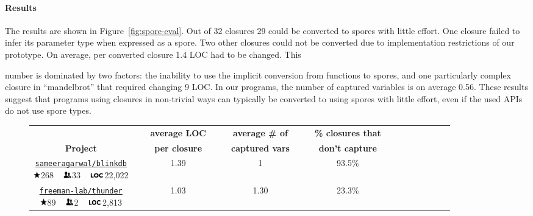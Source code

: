 \documentclass[runningheads]{llncs}
\newcommand{\myrowcolour}{\rowcolor[gray]{0.925}}
\newcommand*\loc{\includegraphics[height=0.65em,keepaspectratio]{loc}}
\newcommand*\stars{\includegraphics[height=0.8em,keepaspectratio]{stars}}
\newcommand*\contribs{\includegraphics[height=0.8em,keepaspectratio]{contribs}}
\begin{document}
\begin{sloppypar}
\paragraph{\textbf{Results}} The results are shown in
Figure~\ref{fig:spore-eval}. Out of 32 closures 29 could be converted
to spores with little effort. One closure failed to infer its parameter
type when expressed as a spore. Two other closures could not be converted
due to implementation restrictions of our prototype. On average, per
converted closure 1.4 LOC had to be changed. This

\noindent number is dominated
by two factors: the inability to use the implicit conversion from functions
to spores, and one particularly complex closure in ``mandelbrot'' that
required changing 9 LOC. In our programs, the number of captured variables
is on average 0.56. These results suggest that programs using closures in
non-trivial ways can typically be converted to using spores with little
effort, even if the used APIs do not use spore types.


\begin{figure}[t!]
\vspace{-5mm}
\begin{longtable}{c@{}c c@{}c c@{}c c@{}c c@{}c c@{}c c@{}c }
\toprule%

{\bfseries } && {\bfseries ~average LOC~} && {\bfseries ~average \# of~} && {\bfseries ~\% closures that~} \\
{\bfseries Project} && {\bfseries per closure} && {\bfseries captured vars} && {\bfseries don't capture} \\

\cmidrule(l){0-1} \cmidrule(l){2-3} \cmidrule(l){4-5} \cmidrule(l){6-7}



\parbox[c][0.75cm]{4cm}{\centering\normalsize\href{https://github.com/sameeragarwal/blinkdb}{\texttt{sameeragarwal/blinkdb}}\\ \stars 268 ~ \contribs 33 ~ \loc 22,022} && 1.39 && 1 && 93.5\% \\

\myrowcolour%
\parbox[c][0.75cm]{4cm}{\centering\normalsize\href{https://github.com/freeman-lab/thunder}{\texttt{freeman-lab/thunder}}\\ \stars 89 ~ \contribs 2 ~ \loc 2,813} && 1.03 && 1.30 && 23.3\% \\


\end{longtable}
\end{figure}
\end{sloppypar}
\end{document}
